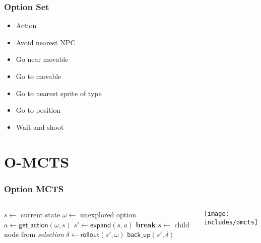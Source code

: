 \documentclass[aspectratio=169]{beamer}
\begin{document}
\begin{frame}
	\frametitle{Option Set}
	\begin{itemize}
		\item Action
		\item Avoid nearest NPC
		\item Go near movable
		\item Go to movable
		\item Go to nearest sprite of type
		\item Go to position
		\item Wait and shoot
	\end{itemize}
\end{frame}

\section{O-MCTS}
\begin{frame}
	\frametitle{Option MCTS}
	\begin{columns}
		\small
		\vspace{-.5em}
		\begin{algorithmic}[1]
				\State $s \gets $ current state
						\State $\omega \gets$ unexplored option
						\State $a \gets \mathsf{get\_action}(\omega, s)$ 
						\State $s' \gets \mathsf{expand}(s, a)$ 
						\State \textbf{break} \label{alg:omcts:break}
					\Else \label{alg:omcts:sexpand}
						\State $s \gets$ child node from \emph{selection}
					\EndIf \label{alg:omcts:eexpand}
				\EndWhile
				\State $\delta \gets \mathsf{rollout}(s', \omega)$
				\State $\mathsf{back\_up}(s', \delta)$
			\EndWhile
			\State {}
		\end{algorithmic}

		\texttt{[image: includes/omcts]}
	\end{columns}
\end{frame}
\end{document}

